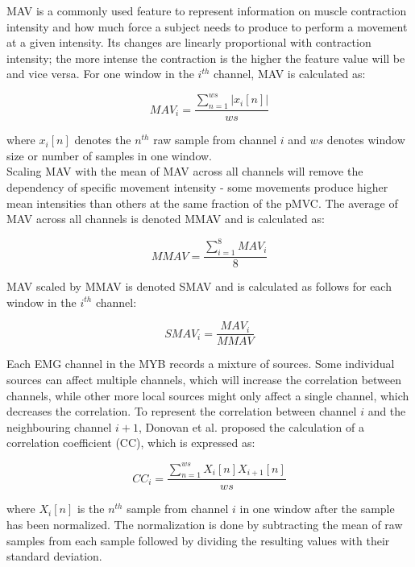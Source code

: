 MAV is a commonly used feature to represent information on muscle contraction intensity and how much force a subject needs to produce to perform a movement at a given intensity. Its changes are linearly proportional with contraction intensity; the more intense the contraction is the higher the feature value will be and vice versa. For one window in the $i^{th}$ channel, MAV is calculated as:

\begin{equation} \label{eq:MAV}
MAV_i=\frac{\sum\limits_{n=1}^{ws}|x_i[n]|}{ws}
\end{equation}

where $x_i[n]$ denotes the $n^{th}$ raw sample from channel $i$ and $ws$ denotes window size or number of samples in one window. \\
Scaling MAV with the mean of MAV across all channels will remove the dependency of specific movement intensity - some movements produce higher mean intensities than others at the same fraction of the pMVC. The average of MAV across all channels is denoted MMAV and is calculated as: 

\begin{equation} \label{eq:MMAV}
MMAV=\frac{\sum\limits_{i=1}^{8}MAV_i}{8}
\end{equation}

MAV scaled by MMAV is denoted SMAV and is calculated as follows for each window in the $i^{th}$ channel:

\begin{equation} \label{eq:SMAV}
SMAV_i=\frac{MAV_i}{MMAV}
\end{equation}

Each EMG channel in the MYB records a mixture of sources. Some individual sources can affect multiple channels, which will increase the correlation between channels, while other more local sources might only affect a single channel, which decreases the correlation. To represent the correlation between channel $i$ and the neighbouring channel $i+1$, Donovan et al. proposed the calculation of a correlation coefficient (CC), which is expressed as: 

\begin{equation} \label{eq:CC}
CC_i=\frac{\sum\limits_{n=1}^{ws}X_i[n]X_{i+1}[n]}{ws}
\end{equation}

where $X_i[n]$ is the $n^{th}$ sample from channel $i$ in one window after the sample has been normalized. The normalization is done by subtracting the mean of raw samples from each sample followed by dividing the resulting values with their standard deviation.  

